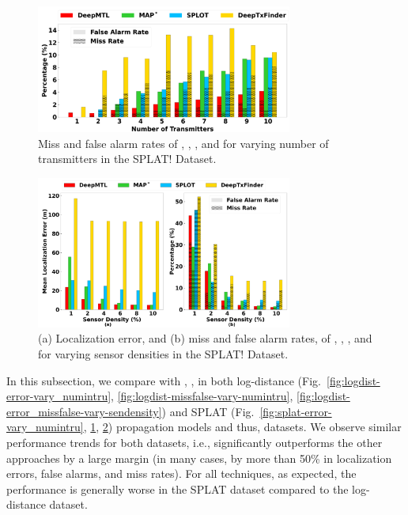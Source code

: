 \begin{figure}[ht]
	\centering
	\includegraphics[width=0.75\textwidth]{chapters/wowmom-pmc/figures/splat-missfalse_vary_numintru.png}
	\caption{Miss and false alarm rates of \our, \map, \splot, and \deeptx for varying number of transmitters in the SPLAT! Dataset.}
	\label{fig:splat-missfalse-vary-numintru}
\end{figure}


\begin{figure}[ht]
	\centering
	\includegraphics[width=0.75\textwidth]{chapters/wowmom-pmc/figures/splat-error_missfalse_vary_sendensity.png}
	\caption{(a) Localization error, and (b) miss and false alarm rates, of \our, \map, \splot, and \deeptx for varying sensor densities in the SPLAT! Dataset.}
	\label{fig:splat-error-vary-sendensity}
\end{figure}



In this subsection, we compare \our with \splot, \map, \deeptx in both log-distance (Fig.~\ref{fig:logdist-error-vary_numintru}, \ref{fig:logdist-missfalse-vary-numintru}, \ref{fig:logdist-error_missfalse-vary-sendensity}) and SPLAT (Fig.~\ref{fig:splat-error-vary_numintru}, \ref{fig:splat-missfalse-vary-numintru}, \ref{fig:splat-error-vary-sendensity}) propagation models and thus, datasets.
We observe similar performance trends for both datasets, i.e., 
\our significantly outperforms the other approaches by a large margin (in many cases, by more
than 50\% in localization errors, false alarms, and miss rates). For all techniques, as expected,
the performance is generally worse in the SPLAT dataset compared to the log-distance dataset.

